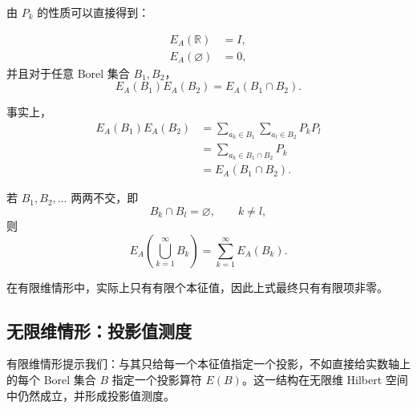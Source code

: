 \documentclass[UTF8,a4paper,11pt,openany]{ctexbook}
\begin{document}
由 $P_k$ 的性质可以直接得到：

\begin{align}
    E_A(\mathbb R)&=I,\\
    E_A(\varnothing)&=0,
\end{align}
并且对于任意 Borel 集合 $B_1,B_2$，
\begin{equation}
    E_A(B_1)E_A(B_2)
    =
    E_A(B_1\cap B_2).
\end{equation}

事实上，
\begin{align}
    E_A(B_1)E_A(B_2)
    &=
    \sum_{a_k\in B_1}
    \sum_{a_l\in B_2}
    P_kP_l
    \nonumber\\
    &=
    \sum_{a_k\in B_1\cap B_2}P_k
    \nonumber\\
    &=
    E_A(B_1\cap B_2).
\end{align}

若 $B_1,B_2,\ldots$ 两两不交，即
\[
B_k\cap B_l=\varnothing,
\qquad k\neq l,
\]
则
\begin{equation}
    E_A\!\left(\bigcup_{k=1}^{\infty}B_k\right)
    =
    \sum_{k=1}^{\infty}E_A(B_k).
\end{equation}

在有限维情形中，实际上只有有限个本征值，因此上式最终只有有限项非零。

\subsection{无限维情形：投影值测度}

有限维情形提示我们：与其只给每一个本征值指定一个投影，不如直接给实数轴上的每个 Borel 集合 $B$ 指定一个投影算符 $E(B)$。这一结构在无限维 Hilbert 空间中仍然成立，并形成投影值测度。
\end{document}
